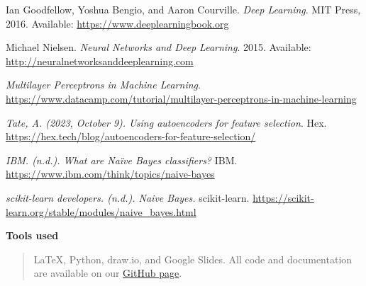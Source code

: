 \begin{thebibliography}{9}

    Ian Goodfellow, Yoshua Bengio, and Aaron Courville. 
    \textit{Deep Learning}. 
    MIT Press, 2016. Available: \url{https://www.deeplearningbook.org}
    
    Michael Nielsen. 
    \textit{Neural Networks and Deep Learning}. 
    2015. Available: \url{http://neuralnetworksanddeeplearning.com}
    
    \textit{Multilayer Perceptrons in Machine Learning}.  \url{https://www.datacamp.com/tutorial/multilayer-perceptrons-in-machine-learning}
    
    \textit{Tate, A. (2023, October 9). Using autoencoders for feature selection}. Hex. \href{https://hex.tech/blog/autoencoders-for-feature-selection/}{https://hex.tech/blog/autoencoders-for-feature-selection/}
    
    \textit{IBM. (n.d.). What are Naïve Bayes classifiers?} IBM. \href{https://www.ibm.com/think/topics/naive-bayes}{https://www.ibm.com/think/topics/naive-bayes}
    
    \textit{scikit-learn developers. (n.d.). Naive Bayes.} scikit-learn. \href{https://scikit-learn.org/stable/modules/naive_bayes.html}{https://scikit-learn.org/stable/modules/naive_bayes.html}
    \end{thebibliography}
    
    
    
    
    \noindent \textbf{{\Large Tools used}}
    \begin{quote}
         LaTeX, Python, draw.io, and Google Slides. All code and documentation are available on our \href{https://github.com/eljesa-kqiku/machine-learning-seminar-project}{GitHub page}.
        \end{quote}